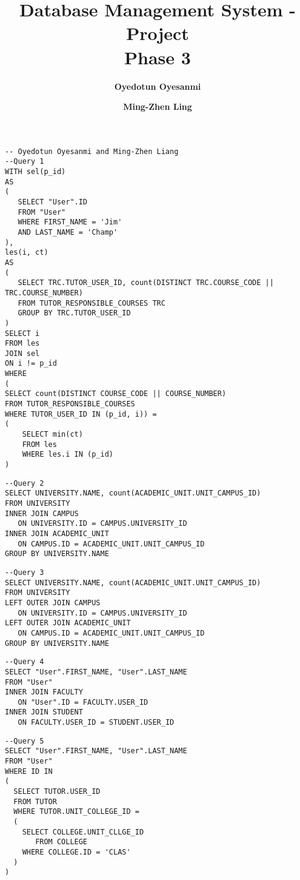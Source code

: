 \documentclass[12pt]{article}
\author{
	\textbf{Oyedotun Oyesanmi } 
	\and 
	\textbf{Ming-Zhen Ling}}
\title{Database Management System - Project\\Phase 3}
\begin{document}
	\maketitle
	\pagebreak
	
	
\begin{lstlisting}
-- Oyedotun Oyesanmi and Ming-Zhen Liang
--Query 1
WITH sel(p_id) 
AS 
(
   SELECT "User".ID 
   FROM "User" 
   WHERE FIRST_NAME = 'Jim' 
   AND LAST_NAME = 'Champ'
),
les(i, ct) 
AS 
(
   SELECT TRC.TUTOR_USER_ID, count(DISTINCT TRC.COURSE_CODE || TRC.COURSE_NUMBER)
   FROM TUTOR_RESPONSIBLE_COURSES TRC 
   GROUP BY TRC.TUTOR_USER_ID
)
SELECT i 
FROM les 
JOIN sel 
ON i != p_id
WHERE
(
SELECT count(DISTINCT COURSE_CODE || COURSE_NUMBER)
FROM TUTOR_RESPONSIBLE_COURSES
WHERE TUTOR_USER_ID IN (p_id, i)) =
(
    SELECT min(ct) 
    FROM les 
    WHERE les.i IN (p_id)
)
	\end{lstlisting}
	
	
\begin{lstlisting}
--Query 2
SELECT UNIVERSITY.NAME, count(ACADEMIC_UNIT.UNIT_CAMPUS_ID)
FROM UNIVERSITY
INNER JOIN CAMPUS
   ON UNIVERSITY.ID = CAMPUS.UNIVERSITY_ID
INNER JOIN ACADEMIC_UNIT
   ON CAMPUS.ID = ACADEMIC_UNIT.UNIT_CAMPUS_ID
GROUP BY UNIVERSITY.NAME
\end{lstlisting}

\pagebreak

\begin{lstlisting}
--Query 3
SELECT UNIVERSITY.NAME, count(ACADEMIC_UNIT.UNIT_CAMPUS_ID)
FROM UNIVERSITY
LEFT OUTER JOIN CAMPUS
   ON UNIVERSITY.ID = CAMPUS.UNIVERSITY_ID
LEFT OUTER JOIN ACADEMIC_UNIT
   ON CAMPUS.ID = ACADEMIC_UNIT.UNIT_CAMPUS_ID
GROUP BY UNIVERSITY.NAME
\end{lstlisting}


\begin{lstlisting}
--Query 4
SELECT "User".FIRST_NAME, "User".LAST_NAME
FROM "User"
INNER JOIN FACULTY
   ON "User".ID = FACULTY.USER_ID
INNER JOIN STUDENT
   ON FACULTY.USER_ID = STUDENT.USER_ID
\end{lstlisting}


\begin{lstlisting}
--Query 5
SELECT "User".FIRST_NAME, "User".LAST_NAME
FROM "User"
WHERE ID IN
(
  SELECT TUTOR.USER_ID
  FROM TUTOR
  WHERE TUTOR.UNIT_COLLEGE_ID =
  (
    SELECT COLLEGE.UNIT_CLLGE_ID
	   FROM COLLEGE
	WHERE COLLEGE.ID = 'CLAS'
  )
)
\end{lstlisting}

\pagebreak
\end{document}
